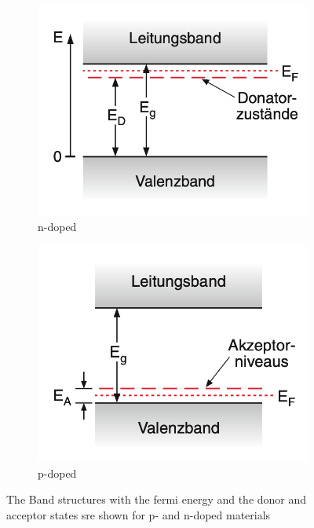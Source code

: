 \begin{figure}
    \centering
    \begin{subfigure}{0.49\textwidth}
        \includegraphics[width = \textwidth]{bilder/n_Donatorschema_demtroeder.png}
        \caption{n-doped}
    \end{subfigure}
    \hfill
    \begin{subfigure}{0.49\textwidth}
        \includegraphics[width = \textwidth]{bilder/p_Donatorschema_demtroeder.png}
        \caption{p-doped}
    \end{subfigure}
    \caption{The Band structures with the fermi energy and the donor and acceptor states sre shown for p- and n-doped materials \cite{demtroeder}}
    \label{fig:doting}
\end{figure}

